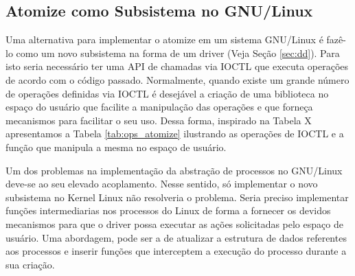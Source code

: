 \subsection{Atomize como Subsistema no GNU/Linux}

Uma alternativa para implementar o atomize em um sistema GNU/Linux é fazê-lo
como um novo subsistema na forma de um driver (Veja Seção \ref{sec:dd}). Para
isto seria necessário ter uma API de chamadas via IOCTL que executa operações
de acordo com o código passado. Normalmente, quando existe um grande número de
operações definidas via IOCTL é desejável a criação de uma biblioteca no espaço
do usuário que facilite a manipulação das operações e que forneça mecanismos
para facilitar o seu uso. Dessa forma, inspirado na Tabela X apresentamos a
Tabela \ref{tab:ops_atomize} ilustrando as operações de IOCTL e a função que
manipula a mesma no espaço de usuário.



Um dos problemas na implementação da abstração de processos no GNU/Linux
deve-se ao seu elevado acoplamento. Nesse sentido, só implementar o novo
subsistema no Kernel Linux não resolveria o problema. Seria preciso implementar
funções intermediarias nos processos do Linux de forma a fornecer os devidos
mecanismos para que o driver possa executar as ações solicitadas pelo espaço de
usuário. Uma abordagem, pode ser a de atualizar a estrutura de dados referentes
aos processos e inserir funções que interceptem a execução do processo durante
a sua criação.


